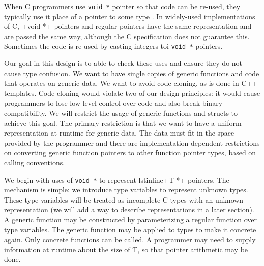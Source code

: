 When C programmers use \lstinline+void *+ pointer so that code
can be re-used, they typically use it place of a pointer to some type .
In widely-used implementations of C, \lstiinline+void *+ pointers and regular
pointers have the same representation and are passed the same way,
although the C specification does not guarantee this.   Sometimes the code
is re-used by casting integers toi \lstinline+void *+ pointers.

Our goal in this design is to able to check these uses and ensure they
do not cause type confusion.  We want to have single copies of generic
functions and code that operates on generic data.  We want to avoid code cloning, 
as is done in C++ templates.  Code cloning would violate two of our design
principles: it would cause programmers to lose low-level control over code and
also break binary compatibility.  We will restrict the usage of generic functions
and structs to achieve this goal.   The primary restriction is that we want to have
a uniform representation at runtime for generic data.  The data must fit in the
space provided by the programmer and there are implementation-dependent
restrictions on converting generic function pointers to other function pointer types,
based on calling conventions.

We begin with uses of \lstinline+void *+ to represent lstinline+T *+ pointers.
The mechanism is simple: we introduce type variables to represent unknown types.
These type variables will be treated as incomplete C types with an unknown
representation (we will add a way to describe representations in a later
section).   A generic function may be constructed by parameterizing a
regular function over type variables.  The generic function may be applied
to types to make it concrete again.  Only concrete functions can be called.
A programmer may need to supply information at runtime about the size of T,
so that pointer arithmetic may be done.

